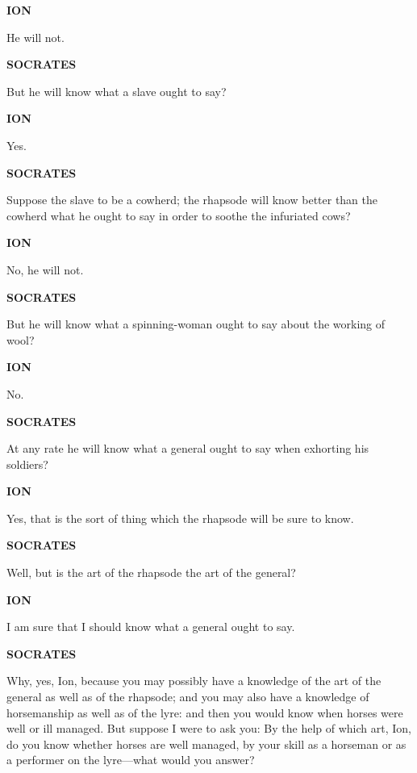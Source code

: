 \documentclass[11pt,letter]{article}
\begin{document}
\par \textbf{ION}
\par   He will not.

\par \textbf{SOCRATES}
\par   But he will know what a slave ought to say?

\par \textbf{ION}
\par   Yes.

\par \textbf{SOCRATES}
\par   Suppose the slave to be a cowherd; the rhapsode will know better than the cowherd what he ought to say in order to soothe the infuriated cows?

\par \textbf{ION}
\par   No, he will not.

\par \textbf{SOCRATES}
\par   But he will know what a spinning-woman ought to say about the working of wool?

\par \textbf{ION}
\par   No.

\par \textbf{SOCRATES}
\par   At any rate he will know what a general ought to say when exhorting his soldiers?

\par \textbf{ION}
\par   Yes, that is the sort of thing which the rhapsode will be sure to know.

\par \textbf{SOCRATES}
\par   Well, but is the art of the rhapsode the art of the general?

\par \textbf{ION}
\par   I am sure that I should know what a general ought to say.

\par \textbf{SOCRATES}
\par   Why, yes, Ion, because you may possibly have a knowledge of the art of the general as well as of the rhapsode; and you may also have a knowledge of horsemanship as well as of the lyre:  and then you would know when horses were well or ill managed. But suppose I were to ask you:  By the help of which art, Ion, do you know whether horses are well managed, by your skill as a horseman or as a performer on the lyre—what would you answer?
\end{document}
